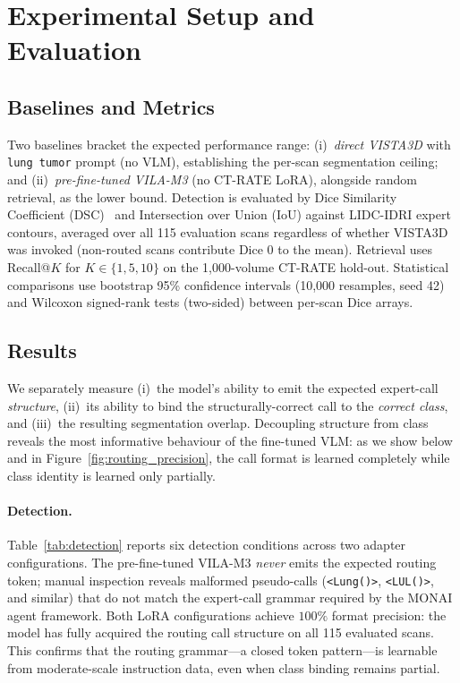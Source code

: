 \documentclass[lineno,referee,pdflatex,sn-mathphys-num]{sn-jnl}
\begin{document}
\FloatBarrier
\section{Experimental Setup and Evaluation}
\label{sec:experiments}

\subsection{Baselines and Metrics}

Two baselines bracket the expected performance range:
(i)~\emph{direct VISTA3D} with \texttt{lung tumor} prompt (no VLM),
establishing the per-scan segmentation ceiling; and
(ii)~\emph{pre-fine-tuned VILA-M3} (no CT-RATE LoRA), alongside random
retrieval, as the lower bound. Detection is evaluated by Dice Similarity
Coefficient (DSC)~\cite{milletari2016} and Intersection over Union (IoU)
against LIDC-IDRI expert contours, averaged over all 115 evaluation scans
regardless of whether VISTA3D was invoked (non-routed scans contribute
Dice 0 to the mean). Retrieval uses Recall@$K$ for $K \in \{1, 5, 10\}$
on the 1{,}000-volume CT-RATE hold-out. Statistical comparisons use
bootstrap 95\% confidence intervals (10{,}000 resamples, seed 42) and
Wilcoxon signed-rank tests (two-sided) between per-scan Dice arrays.

\subsection{Results}

We separately measure (i)~the model's ability to emit the expected
expert-call \emph{structure}, (ii)~its ability to bind the
structurally-correct call to the \emph{correct class}, and (iii)~the
resulting segmentation overlap. Decoupling structure from class reveals
the most informative behaviour of the fine-tuned VLM: as we show below
and in Figure~\ref{fig:routing_precision}, the call format is learned
completely while class identity is learned only partially.

\paragraph{Detection.}
Table~\ref{tab:detection} reports six detection conditions across two
adapter configurations. The pre-fine-tuned VILA-M3 \emph{never} emits
the expected routing token; manual inspection reveals malformed
pseudo-calls (\texttt{<Lung()>}, \texttt{<LUL()>}, and similar) that do
not match the expert-call grammar required by the MONAI agent framework.
Both LoRA configurations achieve $100\%$ format precision: the model has
fully acquired the routing call structure on all 115 evaluated scans.
This confirms that the routing grammar---a closed token pattern---is
learnable from moderate-scale instruction data, even when class binding
remains partial.
\end{document}
